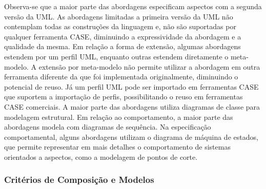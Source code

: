 Observa-se que a maior parte das abordagens especificam aspectos com a segunda versão da UML. As abordagens limitadas a primeira versão da UML não contemplam todas 
as construções da linguagem e, não são suportadas por qualquer ferramenta CASE, diminuindo a expressividade da abordagem e a qualidade da mesma. Em
relação a forma de extensão, algumas abordagens estendem por um perfil UML, enquanto outras estendem diretamente o meta-modelo. A extensão por meta-modelo 
não permite utilizar a abordagem em outra ferramenta diferente da que foi implementada 
originalmente, diminuindo o potencial de reuso. Já um perfil UML pode ser importado em ferramentas CASE que suportem a importação de perfis,
possibilitando o reuso em ferramentas CASE comerciais. A maior parte das abordagens utiliza diagramas de classe para modelagem estrutural. Em relação
ao comportamento, a maior parte das abordagens modela com diagramas de sequência. Na especificação comportamental, alguns abordagens utilizam o
diagrama de máquina de estados, que permite representar em mais detalhes o comportamento de sistemas orientados a aspectos, como a modelagem de pontos
de corte.

\subsubsection{Critérios de Composição e Modelos}

